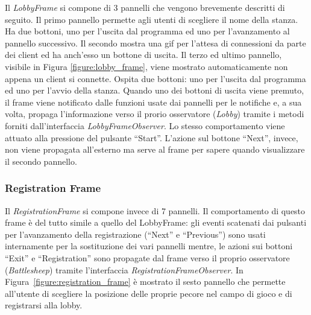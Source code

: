Il \textit{LobbyFrame} si compone di 3 pannelli che vengono brevemente descritti di seguito. Il primo
pannello permette agli utenti di scegliere il nome della stanza. Ha due bottoni,
uno per l'uscita dal programma ed uno per l'avanzamento al pannello successivo.
Il secondo mostra una gif per l'attesa di connessioni da parte dei client ed ha
anch'esso un bottone di uscita. Il terzo ed ultimo pannello, visibile in Figura
\ref{figure:lobby_frame}, viene mostrato automaticamente non appena un client si
connette. Ospita due bottoni: uno per l'uscita dal programma ed uno per l'avvio
della stanza.\newline
Quando uno dei bottoni di uscita viene premuto, il frame viene notificato dalle
funzioni usate dai pannelli per le notifiche e, a sua volta, propaga
l'informazione verso il prorio osservatore (\textit{Lobby}) tramite i metodi
forniti dall'interfaccia \textit{LobbyFrameObserver}. Lo stesso comportamento
viene attuato alla pressione del pulsante ``Start''. L'azione sul bottone
``Next'', invece, non viene propagata all'esterno ma serve al frame per sapere
quando visualizzare il secondo pannello.



\subsubsection{Registration Frame}
Il \textit{RegistrationFrame} si compone invece di 7 pannelli.\newline
Il comportamento di questo frame è del tutto simile a quello del LobbyFrame: gli
eventi scatenati dai pulsanti per l'avanzamento della registrazione (``Next'' e
``Previous'') sono usati internamente per la sostituzione dei vari pannelli
mentre, le azioni sui bottoni ``Exit'' e ``Registration'' sono propagate dal
frame verso il proprio osservatore (\textit{Battlesheep}) tramite l'interfaccia
\textit{RegistrationFrameObserver}.\newline
In Figura~\ref{figure:registration_frame} è mostrato il sesto pannello che
permette all'utente di scegliere la posizione delle proprie pecore nel campo di
gioco e di registrarsi alla lobby.



